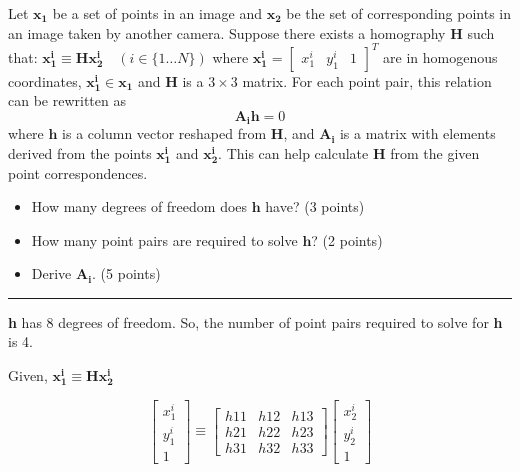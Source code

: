\documentclass[11pt]{article}
\begin{document}
Let \(\mathbf{x_1}\) be a set of points in an image and \(\mathbf{x_2}\)
be the set of corresponding points in an image taken by another camera.
Suppose there exists a homography \(\mathbf{H}\) such that:
\(\mathbf{x^i_1} \equiv \mathbf{Hx^i_2}\quad(i \in \{1\dots N\})\) where
\(\mathbf{x^i_1} = \left[\begin{matrix}x^i_1 & y^i_1 & 1\end{matrix}\right]^T\)
are in homogenous coordinates, \(\mathbf{x_1^i \in \mathbf{x_1}}\) and
\(\mathbf{H}\) is a \(3 \times 3\) matrix. For each point pair, this
relation can be rewritten as \begin{equation*}
\mathbf{A_ih} = 0
\end{equation*} where \(\mathbf{h}\) is a column vector reshaped from
\(\mathbf{H}\), and \(\mathbf{A_i}\) is a matrix with elements derived
from the points \(\mathbf{x^i_1}\) and \(\mathbf{x^i_2}\). This can help
calculate \textbf{H} from the given point correspondences.

\begin{itemize}
\item
  How many degrees of freedom does \(\mathbf{h}\) have? (3 points)
\item
  How many point pairs are required to solve \(\mathbf{h}\)? (2 points)
\item
  Derive \(\mathbf{A_i}\). (5 points)
\end{itemize}

    \begin{center}\rule{0.5\linewidth}{0.5pt}\end{center}

\textbf{h} has 8 degrees of freedom. So, the number of point pairs
required to solve for \textbf{h} is 4.

Given, \(\mathbf{x^i_1} \equiv \mathbf{Hx^i_2}\)

\[ \begin{bmatrix}
x^i_1 \\
y^i_1 \\
1
\end{bmatrix} \equiv \begin{bmatrix}
h11 & h12 & h13 \\
h21 & h22 & h23 \\
h31 & h32 & h33 
\end{bmatrix}\begin{bmatrix}
x^i_2 \\
y^i_2 \\
1
\end{bmatrix}\]
\end{document}
